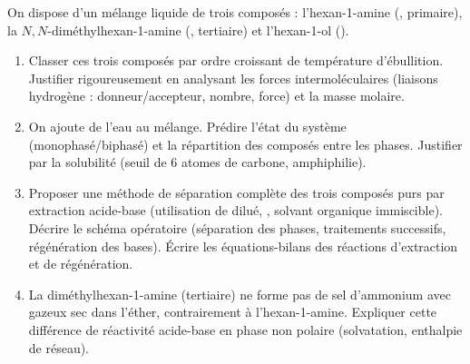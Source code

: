 \documentclass[11pt]{article}
\begin{document}
\begin{exercice}
On dispose d'un mélange liquide de trois composés : l'hexan-1-amine (, primaire), la $N,N$-diméthylhexan-1-amine (, tertiaire) et l'hexan-1-ol ().
\begin{enumerate}
    \item Classer ces trois composés par ordre croissant de température d'ébullition. Justifier rigoureusement en analysant les forces intermoléculaires (liaisons hydrogène : donneur/accepteur, nombre, force) et la masse molaire.
    \item On ajoute de l'eau au mélange. Prédire l'état du système (monophasé/biphasé) et la répartition des composés entre les phases. Justifier par la solubilité (seuil de 6 atomes de carbone, amphiphilie).
    \item Proposer une méthode de séparation complète des trois composés purs par extraction acide-base (utilisation de  dilué, , solvant organique immiscible). Décrire le schéma opératoire (séparation des phases, traitements successifs, régénération des bases). Écrire les équations-bilans des réactions d'extraction et de régénération.
    \item La diméthylhexan-1-amine (tertiaire) ne forme pas de sel d'ammonium avec  gazeux sec dans l'éther, contrairement à l'hexan-1-amine. Expliquer cette différence de réactivité acide-base en phase non polaire (solvatation, enthalpie de réseau).
\end{enumerate}
\end{exercice}
\end{document}
